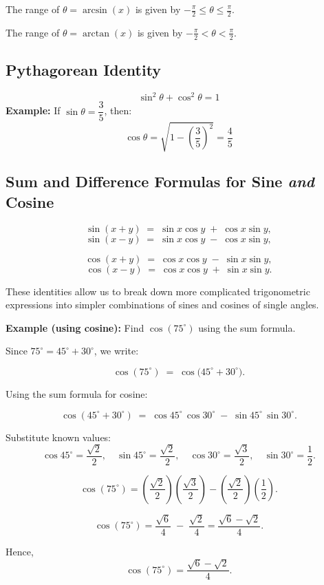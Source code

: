 \documentclass{article}
\begin{document}
\begin{multicols}{2}
\noindent
The range of \(\theta = \arcsin(x)\) is given by \(-\frac{\pi}{2} \leq \theta \leq \frac{\pi}{2}\).

\noindent
The range of \(\theta = \arctan(x)\) is given by \(-\frac{\pi}{2} < \theta < \frac{\pi}{2}\).

\subsection*{Pythagorean Identity}
\[
\sin^2 \theta + \cos^2 \theta = 1
\]
\textbf{Example:} If \( \sin \theta = \dfrac{3}{5} \), then:
\[
\cos \theta = \sqrt{1 - \left( \dfrac{3}{5} \right)^2} = \dfrac{4}{5}
\]
\subsection*{Sum and Difference Formulas for Sine \emph{and} Cosine}

\[
\sin(x + y) \;=\; \sin x \cos y \;+\; \cos x \sin y,
\]
\[
\sin(x - y) \;=\; \sin x \cos y \;-\; \cos x \sin y,
\]

\[
\cos(x + y) \;=\; \cos x \cos y \;-\; \sin x \sin y,
\]
\[
\cos(x - y) \;=\; \cos x \cos y \;+\; \sin x \sin y.
\]

These identities allow us to break down more complicated trigonometric expressions into simpler combinations of sines and cosines of single angles.  

\textbf{Example (using cosine):} Find \(\cos(75^\circ)\) using the sum formula.  

Since \(75^\circ = 45^\circ + 30^\circ\), we write:

\[
\cos(75^\circ) \;=\; \cos\bigl(45^\circ + 30^\circ\bigr).
\]

Using the sum formula for cosine:

\[
\cos(45^\circ + 30^\circ)
\;=\;
\cos 45^\circ \,\cos 30^\circ \;-\; \sin 45^\circ \,\sin 30^\circ.
\]

Substitute known values:
\[
\cos 45^\circ = \frac{\sqrt{2}}{2}, 
\quad
\sin 45^\circ = \frac{\sqrt{2}}{2},
\quad
\cos 30^\circ = \frac{\sqrt{3}}{2}, 
\quad
\sin 30^\circ = \frac{1}{2}.
\]

\[
\cos(75^\circ)
= \left(\frac{\sqrt{2}}{2}\right)\!\left(\frac{\sqrt{3}}{2}\right)
- \left(\frac{\sqrt{2}}{2}\right)\!\left(\frac{1}{2}\right).
\]

\[
\cos(75^\circ)
= \frac{\sqrt{6}}{4} \;-\; \frac{\sqrt{2}}{4}
= \frac{\sqrt{6} - \sqrt{2}}{4}.
\]

Hence,
\[
\boxed{\cos(75^\circ) = \frac{\sqrt{6} - \sqrt{2}}{4}.}
\]


\end{multicols}
\end{document}
